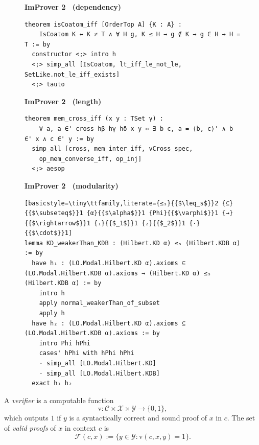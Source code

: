 \begin{figure}[tbp]
\begin{minipage}[t]{0.33\textwidth}
\textbf{ImProver 2 \ (dependency)}
\begin{lstlisting}[basicstyle=\tiny\ttfamily]
theorem isCoatom_iff [OrderTop A] {K : A} :
    IsCoatom K ↔ K ≠ T ∧ ∀ H g, K ≤ H → g ∉ K → g ∈ H → H = T := by
  constructor <;> intro h
  <;> simp_all [IsCoatom, lt_iff_le_not_le, SetLike.not_le_iff_exists]
  <;> tauto
\end{lstlisting}
\end{minipage}\begin{minipage}[t]{0.33\textwidth}
\textbf{ImProver 2 \ (length)}
\begin{lstlisting}[basicstyle=\tiny\ttfamily]
theorem mem_cross_iff (x y : TSet γ) :
    ∀ a, a ∈' cross hβ hγ hδ x y ↔ ∃ b c, a = ⟨b, c⟩' ∧ b ∈' x ∧ c ∈' y := by
  simp_all [cross, mem_inter_iff, vCross_spec,
    op_mem_converse_iff, op_inj]
  <;> aesop
\end{lstlisting}
\end{minipage}
\begin{minipage}[t]{0.33\textwidth}
\textbf{ImProver 2 \ (modularity)}
\begin{lstlisting}[basicstyle=\tiny\ttfamily,literate={≤ₛ}{{$\leq_s$}}2 {⊆}{{$\subseteq$}}1 {α}{{$\alpha$}}1 {Phi}{{$\varphi$}}1 {→}{{$\rightarrow$}}1 {₁}{{$_1$}}1 {₂}{{$_2$}}1 {·}{{$\cdot$}}1]
lemma KD_weakerThan_KDB : (Hilbert.KD α) ≤ₛ (Hilbert.KDB α) := by
  have h₁ : (LO.Modal.Hilbert.KD α).axioms ⊆ (LO.Modal.Hilbert.KDB α).axioms → (Hilbert.KD α) ≤ₛ (Hilbert.KDB α) := by
    intro h
    apply normal_weakerThan_of_subset
    apply h
  have h₂ : (LO.Modal.Hilbert.KD α).axioms ⊆ (LO.Modal.Hilbert.KDB α).axioms := by
    intro Phi hPhi
    cases' hPhi with hPhi hPhi
    · simp_all [LO.Modal.Hilbert.KD]
    · simp_all [LO.Modal.Hilbert.KDB]
  exact h₁ h₂
\end{lstlisting}
\end{minipage}
\label{fig:main-demo}
\end{figure}

\begin{definition}
A \emph{verifier} is a computable function
\[
\mathrm{v}:\mathcal{C} \times \mathcal{X} \times \mathcal{Y} \to \{0,1\},
\]
which outputs $1$ if $y$ is a syntactically correct and sound proof of $x$ in $c$. The set of \emph{valid proofs} of $x$ in context $c$ is
\[
\mathcal{F}(c,x) := \{y\in\mathcal{Y}:\mathrm{v}(c,x,y)=1\}.
\]
\end{definition}

